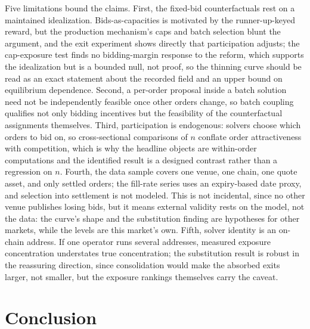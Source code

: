 \documentclass[11pt]{article}
\theoremstyle{plain}
\theoremstyle{definition}
\theoremstyle{remark}
\begin{document}
Five limitations bound the claims. First, the fixed-bid counterfactuals rest on a maintained idealization. Bids-as-capacities is motivated by the runner-up-keyed reward, but the production mechanism's caps and batch selection blunt the argument, and the exit experiment shows directly that participation adjusts; the cap-exposure test finds no bidding-margin response to the reform, which supports the idealization but is a bounded null, not proof, so the thinning curve should be read as an exact statement about the recorded field and an upper bound on equilibrium dependence. Second, a per-order proposal inside a batch solution need not be independently feasible once other orders change, so batch coupling qualifies not only bidding incentives but the feasibility of the counterfactual assignments themselves. Third, participation is endogenous: solvers choose which orders to bid on, so cross-sectional comparisons of $n$ conflate order attractiveness with competition, which is why the headline objects are within-order computations and the identified result is a designed contrast rather than a regression on $n$. Fourth, the data sample covers one venue, one chain, one quote asset, and only settled orders; the fill-rate series uses an expiry-based date proxy, and selection into settlement is not modeled. This is not incidental, since no other venue publishes losing bids, but it means external validity rests on the model, not the data: the curve's shape and the substitution finding are hypotheses for other markets, while the levels are this market's own. Fifth, solver identity is an on-chain address. If one operator runs several addresses, measured exposure concentration understates true concentration; the substitution result is robust in the reassuring direction, since consolidation would make the absorbed exits larger, not smaller, but the exposure rankings themselves carry the caveat.

\section{Conclusion}
\end{document}
